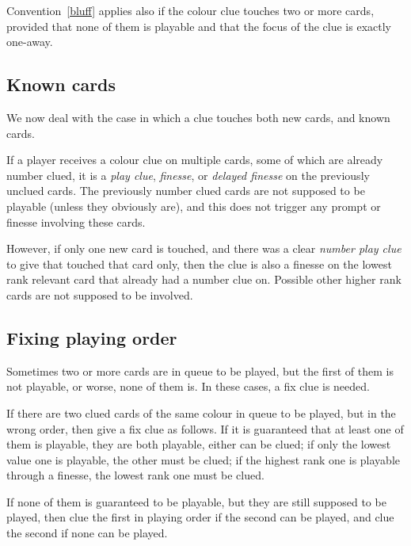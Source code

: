 \begin{convention}
	Convention~\ref{bluff} applies also if the colour clue touches two or more cards, provided that none of them is playable and that the focus of the clue is exactly one-away.
\end{convention}

\subsection{Known cards}

We now deal with the case in which a clue touches both new cards, and known cards.

\begin{convention}
If a player receives a colour clue on multiple cards, some of which are already number clued, it is a \emph{play clue}, \emph{finesse}, or \emph{delayed finesse} on the previously unclued cards. The previously number clued cards are not supposed to be playable (unless they obviously are), and this does not trigger any prompt or finesse involving these cards.

However, if only one new card is touched, and there was a clear \emph{number play clue} to give that touched that card only, then the clue is also a finesse on the lowest rank relevant card that already had a number clue on. Possible other higher rank cards are not supposed to be involved.
\end{convention}

\subsection{Fixing playing order}

Sometimes two or more cards are in queue to be played, but the first of them is not playable, or worse, none of them is. In these cases, a fix clue is needed.

\begin{convention}	
	If there are two clued cards of the same colour in queue to be played, but in the wrong order, then give a fix clue as follows. If it is guaranteed that at least one of them is playable, they are both playable, either can be clued; if only the lowest value one is playable, the other must be clued; if the highest rank one is playable through a finesse, the lowest rank one must be clued.
	
	If none of them is guaranteed to be playable, but they are still supposed to be played, then clue the first in playing order if the second can be played, and clue the second if none can be played.
\end{convention}
	
